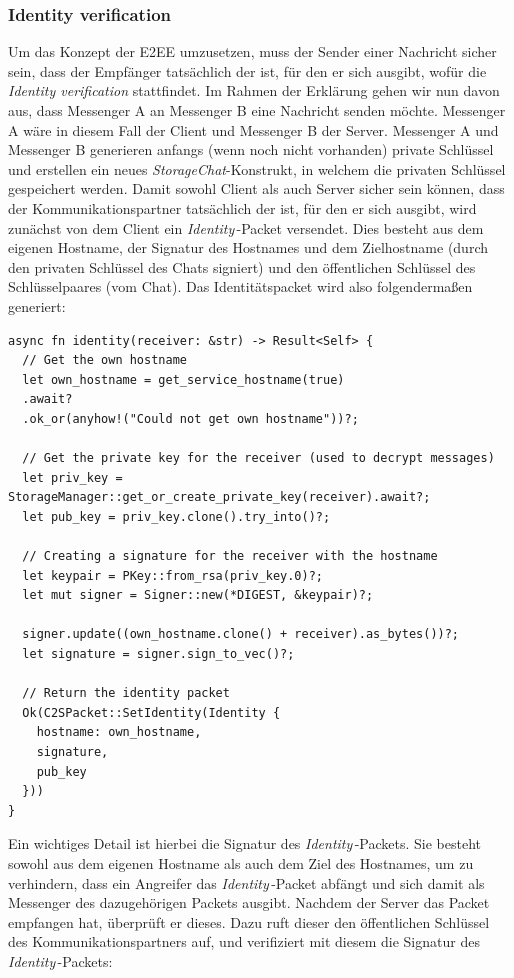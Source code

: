 \documentclass[a4paper,ngerman, headheight=28pt,12pt]{scrartcl}
\newcommand{\identity}{\textit{Identity\,}}
\begin{document}
\subsubsection{Identity verification}
Um das Konzept der E2EE umzusetzen, muss der Sender einer Nachricht sicher sein, dass der Empfänger tatsächlich der ist, für den er sich ausgibt, wofür die \textit{Identity verification} stattfindet. Im Rahmen der Erklärung gehen wir nun davon aus, dass Messenger A an Messenger B eine Nachricht senden möchte. Messenger A wäre in diesem Fall der Client und Messenger B der Server.
Messenger A und Messenger B generieren anfangs (wenn noch nicht vorhanden) private Schlüssel und erstellen ein neues \textit{StorageChat}-Konstrukt, in welchem die privaten Schlüssel gespeichert werden.
Damit sowohl Client als auch Server sicher sein können, dass der Kommunikationspartner tatsächlich der ist, für den er sich ausgibt, wird zunächst von dem Client ein \identity-Packet versendet.
Dies besteht aus dem eigenen Hostname, der Signatur des Hostnames und dem Zielhostname (durch den privaten Schlüssel des Chats signiert) und den öffentlichen Schlüssel des Schlüsselpaares (vom Chat). Das Identitätspacket wird also folgendermaßen generiert:
\begin{verbatim}
async fn identity(receiver: &str) -> Result<Self> {
  // Get the own hostname
  let own_hostname = get_service_hostname(true)
  .await?
  .ok_or(anyhow!("Could not get own hostname"))?;

  // Get the private key for the receiver (used to decrypt messages)
  let priv_key = StorageManager::get_or_create_private_key(receiver).await?;
  let pub_key = priv_key.clone().try_into()?;

  // Creating a signature for the receiver with the hostname
  let keypair = PKey::from_rsa(priv_key.0)?;
  let mut signer = Signer::new(*DIGEST, &keypair)?;

  signer.update((own_hostname.clone() + receiver).as_bytes())?;
  let signature = signer.sign_to_vec()?;

  // Return the identity packet
  Ok(C2SPacket::SetIdentity(Identity {
    hostname: own_hostname,
    signature,
    pub_key
  }))
}
\end{verbatim}
Ein wichtiges Detail ist hierbei die Signatur des \identity-Packets. Sie besteht sowohl aus dem eigenen Hostname als auch dem Ziel des Hostnames, um zu verhindern, dass ein Angreifer das \identity-Packet abfängt und sich damit als Messenger des dazugehörigen Packets ausgibt.
Nachdem der Server das Packet empfangen hat, überprüft er dieses. Dazu ruft dieser den öffentlichen Schlüssel des Kommunikationspartners auf, und verifiziert mit diesem die Signatur des \identity-Packets:
\end{document}
